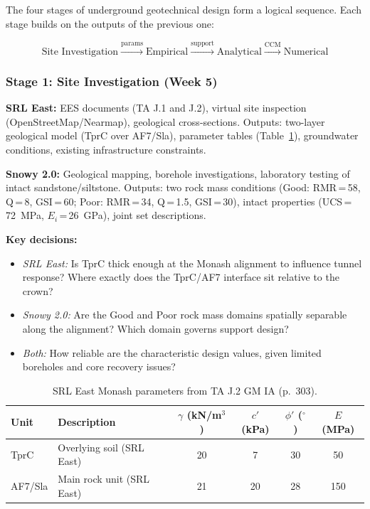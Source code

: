 \documentclass[a4paper,12pt]{article}
\begin{document}
The four stages of underground geotechnical design form a logical sequence. Each stage builds on the outputs of the previous one:

\[
\text{Site Investigation} \xrightarrow{\text{params}} \text{Empirical} \xrightarrow{\text{support}} \text{Analytical} \xrightarrow{\text{CCM}} \text{Numerical}
\]

\subsubsection{Stage 1: Site Investigation (Week 5)}

\textbf{SRL East:} EES documents (TA J.1 and J.2), virtual site inspection (OpenStreetMap/Nearmap), geological cross-sections. Outputs: two-layer geological model (TprC over AF7/Sla), parameter tables (Table~\ref{tab:srl_params}), groundwater conditions, existing infrastructure constraints.

\textbf{Snowy 2.0:} Geological mapping, borehole investigations, laboratory testing of intact sandstone/siltstone. Outputs: two rock mass conditions (Good: RMR\,=\,58, Q\,=\,8, GSI\,=\,60; Poor: RMR\,=\,34, Q\,=\,1.5, GSI\,=\,30), intact properties (UCS\,=\,72~MPa, $E_i$\,=\,26~GPa), joint set descriptions.

\textbf{Key decisions:}
\begin{itemize}[nosep]
    \item \textit{SRL East:} Is TprC thick enough at the Monash alignment to influence tunnel response? Where exactly does the TprC/AF7 interface sit relative to the crown?
    \item \textit{Snowy 2.0:} Are the Good and Poor rock mass domains spatially separable along the alignment? Which domain governs support design?
    \item \textit{Both:} How reliable are the characteristic design values, given limited boreholes and core recovery issues?
\end{itemize}

\begin{table}[h!]
\centering
\small
\begin{tabular}{l l c c c c}
\toprule
\textbf{Unit} & \textbf{Description} & $\gamma$ (kN/m$^3$) & $c'$ (kPa) & $\phi'$ ($^\circ$) & $E$ (MPa) \\
\midrule
TprC & Overlying soil (SRL East) & 20 & 7 & 30 & 50 \\
AF7/Sla & Main rock unit (SRL East) & 21 & 20 & 28 & 150 \\
\bottomrule
\end{tabular}
\caption{SRL East Monash parameters from TA J.2 GM IA (p.~303).}
\label{tab:srl_params}
\end{table}
\end{document}
